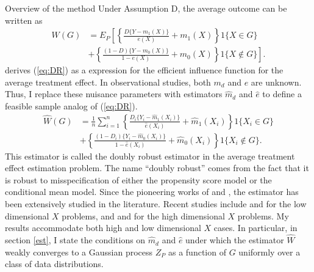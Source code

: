 \documentclass[12pt,oneside,reqno,english]{amsart}
\makeatletter
\renewcommand\subsection{\@startsection{subsection}{2}%
  \z@{-.5\linespacing\@plus-.7\linespacing}{.5\linespacing}%
  {\normalfont\scshape}}
\theoremstyle{definition}
\makeatother
\begin{document}
\subsection{Overview of the method}
Under Assumption D, the average outcome can be written as 
\begin{align}
W(G)&=E_{P}\left[\left\{\frac{D\{Y-m_{1}(X)\}}{e(X)}+m_{1}(X)\right\}1\{X\in G\}\nonumber\right. \\
& \left. +\left\{\frac{(1-D)\{Y-m_{0}(X)\}}{1-e(X)}+m_{0}(X) \right\}1\{X\not\in G\}\right].\label{eq:DR}
\end{align}
\cite{Hahn:98} derives (\ref{eq:DR}) as a expression for the efficient influence function for the average treatment effect. 
 In observational studies, both $m_{d}$ and $e$ are unknown. Thus, I replace these nuisance parameters with estimators $\hat{m}_{d}$ and $\hat{e}$
to define a feasible sample analog of  (\ref{eq:DR}). 
\begin{align}
\hat{W}(G)&=\frac{1}{n}\sum_{i=1}^{n}
\left\{\frac{D_{i}\{Y_{i}-\hat{m}_{1}(X_{i})\}}{\hat{e}(X_{i})}+\hat{m}_{1}(X_{i})\right\}1\{X_{i}\in G\}\nonumber\\
&  +\left\{\frac{(1-D_{i})\{Y_{i}-\hat{m}_{0}(X_{i})\}}{1-\hat{e}(X_{i})}+\hat{m}_{0}(X_{i}) \right\}1\{X_{i}\not\in G\}.\label{eq:DRest}
\end{align}
This estimator is called the doubly robust estimator in the average treatment effect estimation problem. 
The name “doubly robust” comes from the fact that it is robust to misspecification of either the propensity score model or the conditional mean model.
 Since the pioneering works of \cite{RR:95} and 
 \cite{RRZ:95}, the estimator has been extensively studied in the literature. 
Recent studies include \cite{Cattaneo:09} and \cite{RF:18} for the low dimensional $X$ problems, and  \cite{Farrell:15} and \cite{BCFH:17}  
 for the high dimensional $X$ problems. 
My results accommodate both high and low dimensional $X$ cases. In particular, in section \ref{est}, I state the conditions on $\hat{m}_{d}$ and $\hat{e}$ under which the estimator $\hat{W}$
weakly converges to a Gaussian process $Z_{P}$ as a function of $G$ uniformly over a class of data distributions. 
\end{document}
